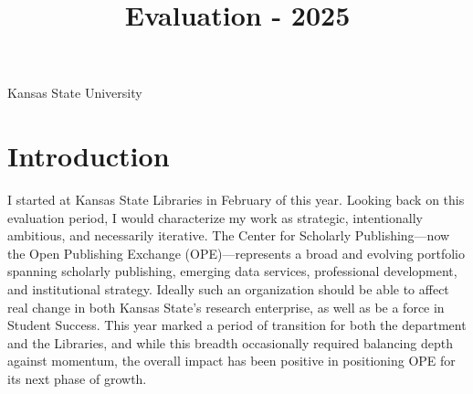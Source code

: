 



\title{Evaluation - 2025}
\address{University Library}{Kansas State University}





\portfoliotitle %




\section{Introduction}

I started at Kansas State Libraries in February of this year. Looking back on this evaluation period, I would characterize my work as strategic, intentionally ambitious, and necessarily iterative. The Center for Scholarly Publishing---now the Open Publishing Exchange (OPE)---represents a broad and evolving portfolio spanning scholarly publishing, emerging data services, professional development, and institutional strategy. Ideally such an organization should be able to affect real change in both Kansas State's research enterprise, as well as be a force in Student Success. This year marked a period of transition for both the department and the Libraries, and while this breadth occasionally required balancing depth against momentum, the overall impact has been positive in positioning OPE for its next phase of growth.

